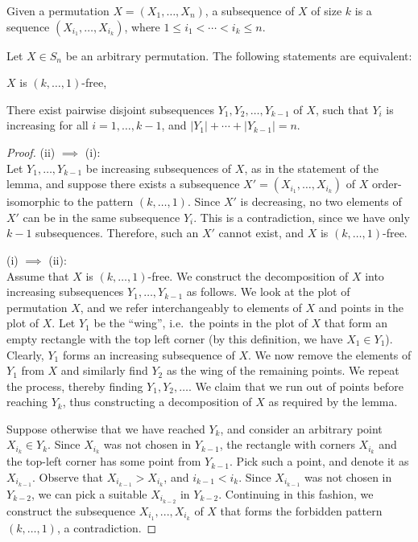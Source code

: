 Given a permutation $X = (X_1, \dots,X_n)$, a subsequence of $X$ of size $k$ is a sequence $(X_{i_1}, \dots, X_{i_k})$, where $1 \leq i_1 < \cdots < i_k \leq n$.

\begin{lemma}
\label{lem:decomposition_monotone}
Let $X \in S_n$ be an arbitrary permutation. The following statements are equivalent:
\begin{compactenum}[(i)] 
\item $X$ is $(k,\dots,1)$-free,
\item There exist pairwise disjoint subsequences $Y_1, Y_2, \dots, Y_{k-1}$ of $X$, such that $Y_i$ is increasing for all $i=1,\dots,k-1$, and $|Y_1| + \cdots + |Y_{k-1}| = n$.
\end{compactenum}
\end{lemma}
\begin{proof}
(ii) $\implies$ (i):\\
Let $Y_1, \dots, Y_{k-1}$ be increasing subsequences of $X$, as in the statement of the lemma, and suppose there exists a subsequence $X' = (X_{i_1}, \dots, X_{i_k})$ of $X$ order-isomorphic to the pattern $(k,\dots,1)$. Since $X'$ is decreasing, no two elements of $X'$ can be in the same subsequence $Y_i$. This is a contradiction, since we have only $k-1$ subsequences. Therefore, such an $X'$ cannot exist, and $X$ is $(k,\dots,1)$-free.

(i) $\implies$ (ii):\\
Assume that $X$ is $(k, \dots, 1)$-free. We construct the decomposition of $X$ into increasing subsequences $Y_1, \dots, Y_{k-1}$ as follows. We look at the plot of permutation $X$, and we refer interchangeably to elements of $X$ and points in the plot of $X$. Let $Y_1$ be the ``wing'', i.e.\ the points in the plot of $X$ that form an empty rectangle with the top left corner (by this definition, we have $X_1 \in Y_1$). Clearly, $Y_1$ forms an increasing subsequence of $X$. We now remove the elements of $Y_1$ from $X$ and similarly find $Y_2$ as the wing of the remaining points. We repeat the process, thereby finding $Y_1, Y_2, \dots$. We claim that we run out of points before reaching $Y_k$, thus constructing a decomposition of $X$ as required by the lemma.

Suppose otherwise that we have reached $Y_k$, and consider an arbitrary point $X_{i_k} \in Y_k$. Since $X_{i_k}$ was not chosen in $Y_{k-1}$, the rectangle with corners $X_{i_k}$ and the top-left corner has some point from $Y_{k-1}$. Pick such a point, and denote it as $X_{i_{k-1}}$. Observe that $X_{i_{k-1}} > X_{i_k}$, and $i_{k-1} < i_k$. Since $X_{i_{k-1}}$ was not chosen in $Y_{k-2}$, we can pick a suitable $X_{i_{k-2}}$ in $Y_{k-2}$. Continuing in this fashion, we construct the subsequence $X_{i_1},...,X_{i_k}$ of $X$ that forms the forbidden pattern $(k,\dots,1)$, a contradiction.
\end{proof}

